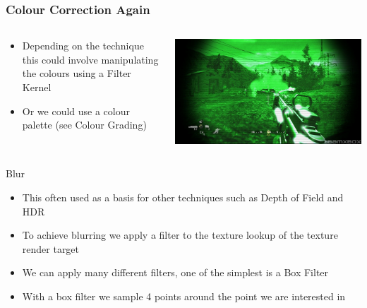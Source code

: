 \begin{frame}
	\frametitle{Colour Correction Again}
		\begin{columns}
		\begin{column}{0.5\textwidth}
			\begin{itemize}
				\item Depending on the technique this could involve manipulating the colours using a Filter Kernel
				\item Or we could use a colour palette (see Colour Grading) 
			\end{itemize}
		\end{column}
		\begin{column}{0.5\textwidth} 
			\begin{center}
				\includegraphics[width=\textwidth]{colour_correction_nightvision}
			\end{center}
		\end{column}
	\end{columns}
\end{frame}

\begin{frame}{Blur}
	\begin{itemize}
		\item\pause This often used as a basis for other techniques such as Depth of Field and HDR
		\item\pause To achieve blurring we apply a filter to the texture lookup of the texture render target
		\item\pause We can apply many different filters, one of the simplest is a Box Filter
		\item\pause With a box filter we sample 4 points around the point we are interested in
	\end{itemize}
\end{frame}


